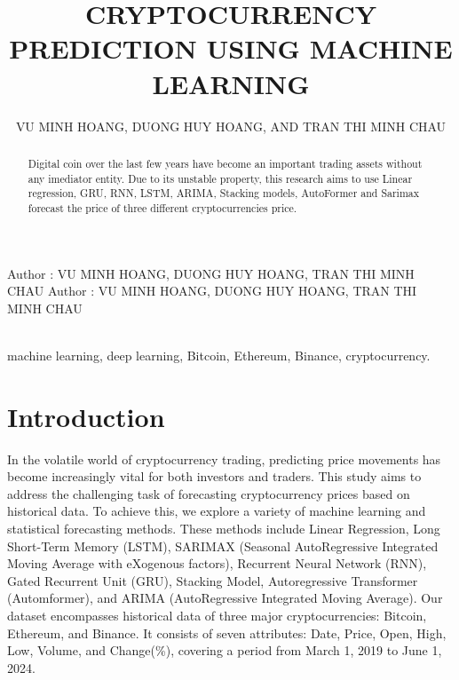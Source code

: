 \documentclass{ieeeojies}
\begin{document}
\title{CRYPTOCURRENCY PREDICTION USING MACHINE LEARNING}

\author{\uppercase{VU MINH HOANG},
\uppercase{DUONG HUY HOANG, and TRAN THI MINH CHAU}}

\address[1]{Faculty of Information Systems, University of Information Technology, 21520244@gm.uit.edu.vn}
\address[1]{Faculty of Information Systems, University of Information Technology, 21522087@gm.uit.edu.vn}
\address[1]{Faculty of Information Systems, University of Information Technology, 21521888@gm.uit.edu.vn}

\markboth
{Author \headeretal: VU MINH HOANG, DUONG HUY HOANG, TRAN THI MINH CHAU}
{Author \headeretal: VU MINH HOANG, DUONG HUY HOANG, TRAN THI MINH CHAU}

\begin{abstract}
Digital coin over the last few years have become an important trading assets without any imediator entity. Due to its unstable property, this research aims to use Linear regression, GRU, RNN, LSTM, ARIMA, Stacking models, AutoFormer and Sarimax forecast the price of three different cryptocurrencies price.  
\end{abstract}
\begin{keywords}\\
    machine learning, deep learning, Bitcoin, Ethereum, Binance, cryptocurrency.
\end{keywords}




\titlepgskip=-15pt

\maketitle

\section{Introduction}
\label{sec:introduction}
\par 
In the volatile world of cryptocurrency trading, predicting price movements has become increasingly vital for both investors and traders. This study aims to address the challenging task of forecasting cryptocurrency prices based on historical data. To achieve this, we explore a variety of machine learning and statistical forecasting methods. These methods include Linear Regression, Long Short-Term Memory (LSTM), SARIMAX (Seasonal AutoRegressive Integrated Moving Average with eXogenous factors), Recurrent Neural Network (RNN), Gated Recurrent Unit (GRU), Stacking Model, Autoregressive Transformer (Automformer), and ARIMA (AutoRegressive Integrated Moving Average). Our dataset encompasses historical data of three major cryptocurrencies: Bitcoin, Ethereum, and Binance. It consists of seven attributes: Date, Price, Open, High, Low, Volume, and Change(\%), covering a period from March 1, 2019 to June 1, 2024.
\end{document}
